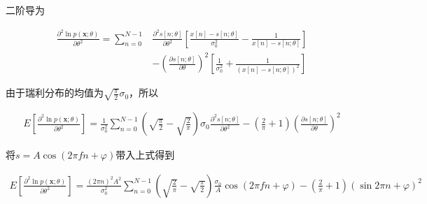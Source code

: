 \documentclass[fontset=windows]{article}
\numberwithin{figure}{section}
\begin{document}
二阶导为

\begin{align*}
    \frac{\partial^2 \ln p(\mathbf{x};\theta)}{\partial \theta^2}=
    \sum_{n=0}^{N-1} & \frac{\partial^2 s[n;\theta]}{\partial \theta^2}
    \left[\frac{x[n]-s[n;\theta]}{\sigma_0^2}-\frac{1}{x[n]-s[n;\theta]}\right]     \\
                     & -\left(\frac{\partial s[n;\theta]}{\partial \theta}\right)^2
    \left[\frac{1}{\sigma_0^2}+\frac{1}{(x[n]-s[n;\theta])^2}\right]
\end{align*}

由于瑞利分布的均值为\(\sqrt{\frac{\pi}{2}}\sigma_0\)，所以

\begin{align*}
    E\left[\frac{\partial^2 \ln p(\mathbf{x};\theta)}{\partial \theta^2}\right]
    =\frac{1}{\sigma_0^2}\sum_{n=0}^{N-1}(\sqrt{\frac{\pi}{2}}-\sqrt{\frac{2}{\pi}})\sigma_0
    \frac{\partial^2 s[n;\theta]}{\partial \theta^2}
    -(\frac{2}{\pi}+1)\left(\frac{\partial s[n;\theta]}{\partial \theta}\right)^2
\end{align*}

将\(s=A\cos (2\pi fn+\varphi)\)带入上式得到

\begin{align*}
    E\left[\frac{\partial^2 \ln p(\mathbf{x};\theta)}{\partial \theta^2}\right]
    =\frac{(2\pi n)^2A^2}{\sigma_0^2}\sum_{n=0}^{N-1}(\sqrt{\frac{2}{\pi}}-
    \sqrt{\frac{\pi}{2}})\frac{\sigma_0}{A}\cos (2\pi fn+\varphi)
    -(\frac{2}{\pi}+1)(\sin 2\pi n+\varphi)^2
\end{align*}



\end{document}
